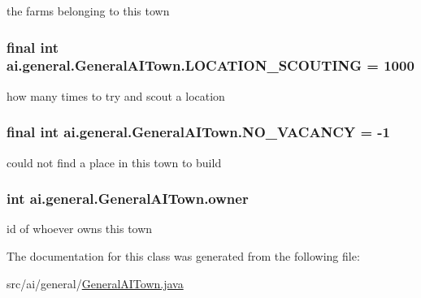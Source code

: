 \label{classai_1_1general_1_1_general_a_i_town_ac5bd96d862c3a343ac10ec425264bb40}
the farms belonging to this town \hypertarget{classai_1_1general_1_1_general_a_i_town_a221de0be695fa283fcfb40779e58db7b}{
\subsubsection[{LOCATION\_\-SCOUTING}]{\setlength{\rightskip}{0pt plus 5cm}final int {\bf ai.general.GeneralAITown.LOCATION\_\-SCOUTING} = 1000}}
\label{classai_1_1general_1_1_general_a_i_town_a221de0be695fa283fcfb40779e58db7b}
how many times to try and scout a location \hypertarget{classai_1_1general_1_1_general_a_i_town_a79df4db8ca7a4de626f676096863b114}{
\subsubsection[{NO\_\-VACANCY}]{\setlength{\rightskip}{0pt plus 5cm}final int {\bf ai.general.GeneralAITown.NO\_\-VACANCY} = -\/1}}
\label{classai_1_1general_1_1_general_a_i_town_a79df4db8ca7a4de626f676096863b114}
could not find a place in this town to build \hypertarget{classai_1_1general_1_1_general_a_i_town_a800050c1a4d3b38e5b278ef5baa022a6}{
\subsubsection[{owner}]{\setlength{\rightskip}{0pt plus 5cm}int {\bf ai.general.GeneralAITown.owner}}}
\label{classai_1_1general_1_1_general_a_i_town_a800050c1a4d3b38e5b278ef5baa022a6}
id of whoever owns this town 

The documentation for this class was generated from the following file:\begin{DoxyCompactItemize}
\item 
src/ai/general/\hyperlink{_general_a_i_town_8java}{GeneralAITown.java}\end{DoxyCompactItemize}
